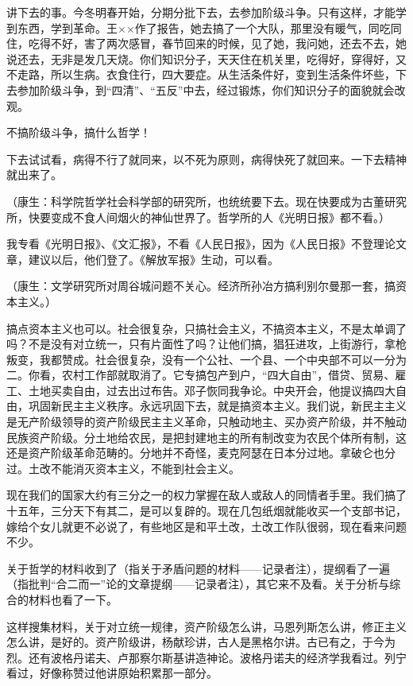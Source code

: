 讲下去的事。今冬明春开始，分期分批下去，去参加阶级斗争。只有这样，才能学到东西，学到革命。王××作了报告，她去搞了一个大队，那里没有暖气，同吃同住，吃得不好，害了两次感冒，春节回来的时候，见了她，我问她，还去不去，她说还去，无非是发几天烧。你们知识分子，天天住在机关里，吃得好，穿得好，又不走路，所以生病。衣食住行，四大要症。从生活条件好，变到生活条件坏些，下去参加阶级斗争，到“四清”、“五反”中去，经过锻炼，你们知识分子的面貌就会改观。

不搞阶级斗争，搞什么哲学！

下去试试看，病得不行了就同来，以不死为原则，病得快死了就回来。一下去精神就出来了。

（康生：科学院哲学社会科学部的研究所，也统统要下去。现在快要成为古董研究所，快要变成不食人间烟火的神仙世界了。哲学所的人《光明日报》都不看。）

我专看《光明日报》、《文汇报》，不看《人民日报》，因为《人民日报》不登理论文章，建议以后，他们登了。《解放军报》生动，可以看。

（康生：文学研究所对周谷城问题不关心。经济所孙冶方搞利别尔曼那一套，搞资本主义。）

搞点资本主义也可以。社会很复杂，只搞社会主义，不搞资本主义，不是太单调了吗？不是没有对立统一，只有片面性了吗？让他们搞，猖狂进攻，上街游行，拿枪叛变，我都赞成。社会很复杂，没有一个公社、一个县、一个中央部不可以一分为二。你看，农村工作部就取消了。它专搞包产到户，“四大自由”，借贷、贸易、雇工、土地买卖自由，过去出过布告。邓子恢同我争论。中央开会，他提议搞四大自由，巩固新民主主义秩序。永远巩固下去，就是搞资本主义。我们说，新民主主义是无产阶级领导的资产阶级民主主义革命，只触动地主、买办资产阶级，并不触动民族资产阶级。分土地给农民，是把封建地主的所有制改变为农民个体所有制，这还是资产阶级革命范畴的。分地并不奇怪，麦克阿瑟在日本分过地。拿破仑也分过。土改不能消灭资本主义，不能到社会主义。

现在我们的国家大约有三分之一的权力掌握在敌人或敌人的同情者手里。我们搞了十五年，三分天下有其二，是可以复辟的。现在几包纸烟就能收买一个支部书记，嫁给个女儿就更不必说了，有些地区是和平土改，土改工作队很弱，现在看来问题不少。

关于哲学的材料收到了（指关于矛盾问题的材料——记录者注），提纲看了一遍（指批判“合二而一”论的文章提纲——记录者注），其它来不及看。关于分析与综合的材料也看了一下。

这样搜集材料，关于对立统一规律，资产阶级怎么讲，马恩列斯怎么讲，修正主义怎么讲，是好的。资产阶级讲，杨献珍讲，古人是黑格尔讲。古已有之，于今为烈。还有波格丹诺夫、卢那察尔斯基讲造神论。波格丹诺夫的经济学我看过。列宁看过，好像称赞过他讲原始积累那一部分。

